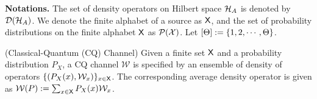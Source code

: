 \textbf{Notations.} The set of density operators on Hilbert space $\mathcal{H}_A$ is denoted by $\mathcal{D}(\mathcal{H}_A)$.
We denote the finite alphabet of a source as $\mathsf{X}$, and  
the set of probability distributions on the finite alphabet $\mathsf{X}$ as $\mathcal{P}(\mathcal{X})$. Let $[\Theta] := \{1,2,\cdots,\Theta\}$. 

\begin{definition}\label{def:CQchannel}(Classical-Quantum (CQ) Channel)
Given a finite set $\mathsf{X}$ and a probability distribution $P_X$, a CQ channel $\mathcal{W}$ is   
specified by an ensemble of density of operators $\{(P_X(x),\mathcal{W}_{x})\}_{ x \in \mathsf{X}}$. The corresponding average density operator is given as $\mathcal{W}(P):= \sum_{x\in\mathsf{X}}P_X(x)\mathcal{W}_x$.
\end{definition}

